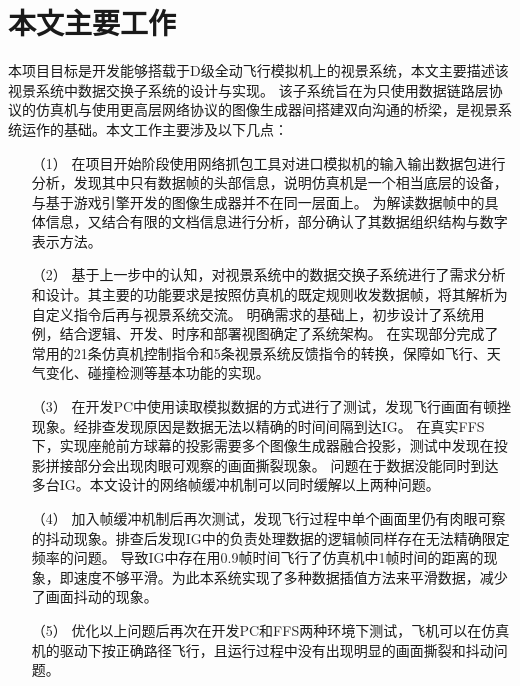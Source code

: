 \section{本文主要工作}
本项目目标是开发能够搭载于D级全动飞行模拟机上的视景系统，本文主要描述该视景系统中数据交换子系统的设计与实现。
该子系统旨在为只使用数据链路层协议的仿真机与使用更高层网络协议的图像生成器间搭建双向沟通的桥梁，是视景系统运作的基础。本文工作主要涉及以下几点：
\begin{itemize}
    \item [（1）]
    在项目开始阶段使用网络抓包工具对进口模拟机的输入输出数据包进行分析，发现其中只有数据帧的头部信息，说明仿真机是一个相当底层的设备，与基于游戏引擎开发的图像生成器并不在同一层面上。
    为解读数据帧中的具体信息，又结合有限的文档信息进行分析，部分确认了其数据组织结构与数字表示方法。
    \item [（2）]
    基于上一步中的认知，对视景系统中的数据交换子系统进行了需求分析和设计。其主要的功能要求是按照仿真机的既定规则收发数据帧，将其解析为自定义指令后再与视景系统交流。
    明确需求的基础上，初步设计了系统用例，结合逻辑、开发、时序和部署视图确定了系统架构。
    在实现部分完成了常用的21条仿真机控制指令和5条视景系统反馈指令的转换，保障如飞行、天气变化、碰撞检测等基本功能的实现。
    \item [（3）]
    在开发PC中使用读取模拟数据的方式进行了测试，发现飞行画面有顿挫现象。经排查发现原因是数据无法以精确的时间间隔到达IG。
    在真实FFS下，实现座舱前方球幕的投影需要多个图像生成器融合投影，测试中发现在投影拼接部分会出现肉眼可观察的画面撕裂现象。
    问题在于数据没能同时到达多台IG。本文设计的网络帧缓冲机制可以同时缓解以上两种问题。
    \item [（4）]
    加入帧缓冲机制后再次测试，发现飞行过程中单个画面里仍有肉眼可察的抖动现象。排查后发现IG中的负责处理数据的逻辑帧同样存在无法精确限定频率的问题。
    导致IG中存在用0.9帧时间飞行了仿真机中1帧时间的距离的现象，即速度不够平滑。为此本系统实现了多种数据插值方法来平滑数据，减少了画面抖动的现象。
    \item [（5）]
    优化以上问题后再次在开发PC和FFS两种环境下测试，飞机可以在仿真机的驱动下按正确路径飞行，且运行过程中没有出现明显的画面撕裂和抖动问题。

\end{itemize}
